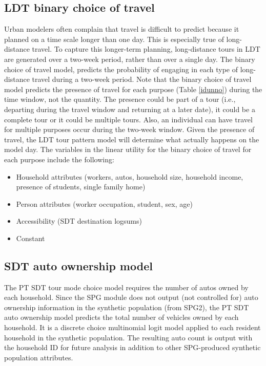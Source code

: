 \subsection{LDT binary choice of travel}
Urban modelers often complain that travel is difficult to predict because it planned on a time scale longer than one day. This is especially true of long-distance travel. To capture this longer-term planning, long-distance tours in LDT are generated over a two-week period, rather than over a single day. The binary choice of travel model, predicts the probability of engaging in each type of long-distance travel during a two-week period. Note that the binary choice of travel model predicts the presence of travel for each purpose (Table \ref{idunno}) during the time window, not the quantity. The presence could be part of a tour (i.e., departing during the travel window and returning at a later date), it could be a complete tour or it could be multiple tours. Also, an individual can have travel for multiple purposes occur during the two-week window. Given the presence of travel, the LDT tour pattern model will determine what actually happens on the model day. The variables in the linear utility for the binary choice of travel for each purpose include the following:
\begin{itemize}
\item Household attributes (workers, autos, household size, household income, presence of students, single family home)
\item Person attributes (worker occupation, student, sex, age)
\item Accessibility (SDT destination logsums)
\item Constant
\end{itemize}

\subsection{SDT auto ownership model}\label{sec:sdt-auto-ownership}
The PT SDT tour mode choice model requires the number of autos owned by each household. Since the SPG module does not output (not controlled for) auto ownership information in the synthetic population (from SPG2), the PT SDT auto ownership model predicts the total number of vehicles owned by each household. It is a discrete choice multinomial logit model applied to each resident household in the synthetic population. The resulting auto count is output with the household ID for future analysis in addition to other SPG-produced synthetic population attributes. 

